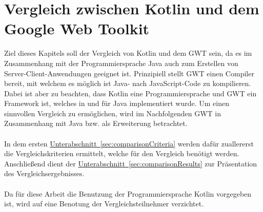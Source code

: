 
\chapter{Vergleich zwischen Kotlin und dem Google Web Toolkit}\label{sec:comparison}
Ziel dieses Kapitels soll der Vergleich von Kotlin und dem \gls{GWT} sein, da es im Zusammenhang mit der Programmiersprache Java auch zum Erstellen von Server-Client-Anwendungen geeignet ist.
Prinzipiell stellt \gls{GWT} einen Compiler bereit, mit welchem es möglich ist Java- nach JavaScript-Code zu kompilieren. Dabei ist aber zu beachten, dass Kotlin eine Programmiersprache und \gls{GWT} ein Framework ist, welches in und für Java implementiert wurde. Um einen sinnvollen Vergleich zu ermöglichen, wird im Nachfolgenden \gls{GWT} in Zusammenhang mit Java bzw. als Erweiterung betrachtet.\\
\\
In dem ersten \hyperref[sec:comparisonCriteria]{Unterabschnitt~\ref{sec:comparisonCriteria}} werden dafür zuallererst die Vergleichskriterien ermittelt, welche für den Vergleich benötigt werden. Anschließend dient der \hyperref[sec:comparisonResults]{Unterabschnitt~\ref{sec:comparisonResults}} zur Präsentation des Vergleichsergebnisses.\\
\\
Da für diese Arbeit die Benutzung der Programmiersprache Kotlin vorgegeben ist, wird auf eine Benotung der Vergleichsteilnehmer verzichtet.

